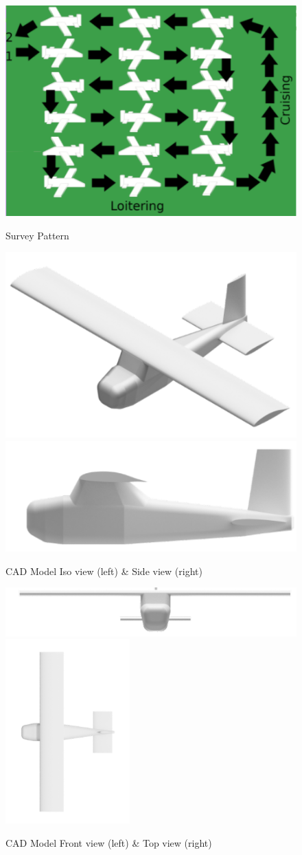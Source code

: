 \documentclass[12pt,A4paper]{article}
\begin{document}
	\begin{figure}[!h]
		\centering
		\includegraphics[width=.5\textwidth]{Holding.PNG} \label{fig:f10}
		\caption{Survey Pattern}
	\end{figure}
	\begin{figure}[!h]
		\centering
		\includegraphics[width=.4\textwidth]{IsoCad.PNG}\hspace{.2 in} \label{fig:f11}
		\includegraphics[width=.4\textwidth]{side.PNG} \label{fig:f12}
		\caption{CAD Model Iso view (left) \& Side view (right)}
	\end{figure}
	\begin{figure}[!h]
		\centering
		\includegraphics[width=.6\textwidth]{Front.PNG} \label{fig:f13}
		\includegraphics[width=.2\textwidth]{Top.PNG} \label{fig:f14}
		\caption{CAD Model Front view (left) \& Top view (right)}
	\end{figure}
\end{document}
